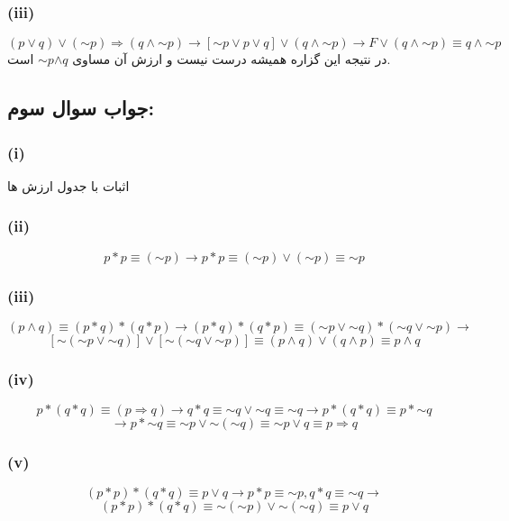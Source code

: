 \documentclass{article}
\newcommand{\tildevar}{\mathord{\sim}}
\begin{document}
			\subsubsection*{(iii)}
				\[
				(p \lor q) \lor (\tildevar p) \Rightarrow (q \land \tildevar p) \rightarrow [\tildevar p \lor p \lor q] \lor (q \land \tildevar p) \rightarrow
				F \lor (q \land \tildevar p) \equiv q \land \tildevar p
				\]
				در نتیجه این گزاره همیشه درست نیست و ارزش آن مساوی $q$$\land$$\tildevar p$ است.

		\subsection*{جواب سوال سوم:}
			\subsubsection*{(i)}
				اثبات با جدول ارزش ها

			\subsubsection*{(ii)}
				\[
				p*p \equiv (\tildevar p) \rightarrow p*p \equiv (\tildevar p) \lor (\tildevar p) \equiv \tildevar p
				\]
			
			\subsubsection*{(iii)}
				\[
				(p \land q) \equiv (p*q)*(q*p) \rightarrow (p*q)*(q*p) \equiv (\tildevar p \lor \tildevar q) * (\tildevar q \lor \tildevar p) \rightarrow
				\]
				\[
				[\tildevar (\tildevar p \lor \tildevar q)] \lor [\tildevar (\tildevar q \lor \tildevar p)] \equiv (p \land q) \lor (q \land p) \equiv p \land q
				\]

			\subsubsection*{(iv)}
				\[
					p*(q*q) \equiv (p \Rightarrow q) \rightarrow q*q \equiv \tildevar q \lor \tildevar q \equiv \tildevar q \rightarrow p*(q*q) \equiv p*\tildevar q
				\]
				\[
					\rightarrow p*\tildevar q \equiv \tildevar p \lor \tildevar (\tildevar q) \equiv \tildevar p \lor q \equiv p \Rightarrow q
				\]
			
			\subsubsection*{(v)}
				\[
					(p*p)*(q*q) \equiv p \lor q \rightarrow p*p \equiv \tildevar p , q*q \equiv \tildevar q \rightarrow
				\]
				\[
					(p*p)*(q*q) \equiv \tildevar (\tildevar p) \lor \tildevar (\tildevar q) \equiv p \lor q
				\]
\end{document}
